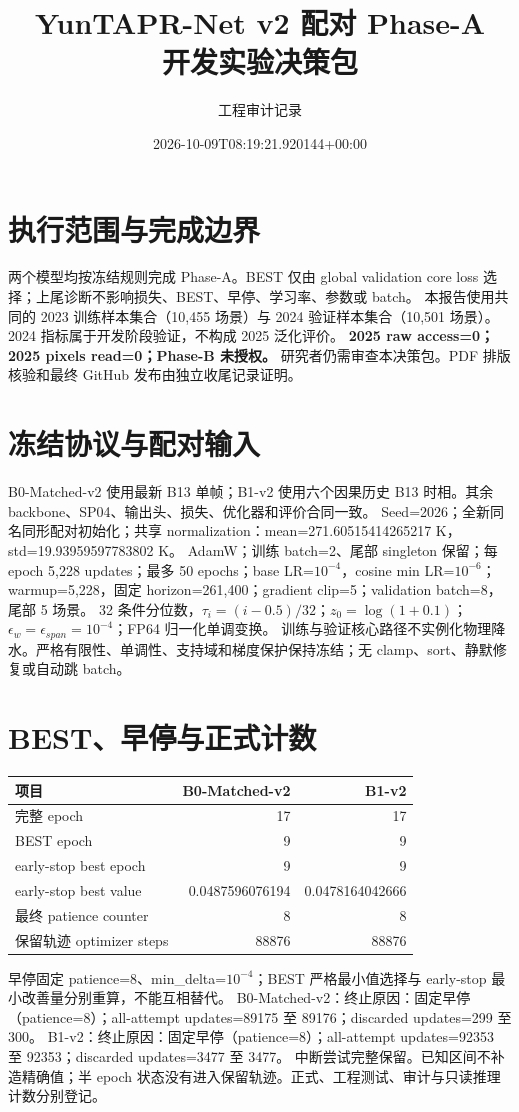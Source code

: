 \documentclass[UTF8,a4paper,11pt,fontset=windows]{ctexart}
\title{YunTAPR-Net v2 配对 Phase-A\\开发实验决策包}
\author{工程审计记录}\date{2026-10-09T08:19:21.920144+00:00}
\begin{document}
\maketitle
\section{执行范围与完成边界}
两个模型均按冻结规则完成 Phase-A。BEST 仅由 global validation core loss 选择；上尾诊断不影响损失、BEST、早停、学习率、参数或 batch。
本报告使用共同的 2023 训练样本集合（10,455 场景）与 2024 验证样本集合（10,501 场景）。2024 指标属于开发阶段验证，不构成 2025 泛化评价。
\textbf{2025 raw access=0；2025 pixels read=0；Phase-B 未授权。}
研究者仍需审查本决策包。PDF 排版核验和最终 GitHub 发布由独立收尾记录证明。
\section{冻结协议与配对输入}
B0-Matched-v2 使用最新 B13 单帧；B1-v2 使用六个因果历史 B13 时相。其余 backbone、SP04、输出头、损失、优化器和评价合同一致。
Seed=2026；全新同名同形配对初始化；共享 normalization：mean=271.60515414265217 K，std=19.93959597783802 K。
AdamW；训练 batch=2、尾部 singleton 保留；每 epoch 5,228 updates；最多 50 epochs；base LR=$10^{-4}$，cosine min LR=$10^{-6}$；warmup=5,228，固定 horizon=261,400；gradient clip=5；validation batch=8，尾部 5 场景。
32 条件分位数，$\tau_i=(i-0.5)/32$；$z_0=\log(1+0.1)$；$\epsilon_w=\epsilon_{span}=10^{-4}$；FP64 归一化单调变换。
训练与验证核心路径不实例化物理降水。严格有限性、单调性、支持域和梯度保护保持冻结；无 clamp、sort、静默修复或自动跳 batch。
\section{BEST、早停与正式计数}
\par\noindent\begin{tabular}{lrr}\toprule 项目 & B0-Matched-v2 & B1-v2\\\midrule
完整 epoch & 17 & 17\\
BEST epoch & 9 & 9\\
early-stop best epoch & 9 & 9\\
early-stop best value & 0.0487596076194 & 0.0478164042666\\
最终 patience counter & 8 & 8\\
保留轨迹 optimizer steps & 88876 & 88876\\
\bottomrule\end{tabular}\par
早停固定 patience=8、min\_delta=$10^{-4}$；BEST 严格最小值选择与 early-stop 最小改善量分别重算，不能互相替代。
B0-Matched-v2：终止原因：固定早停（patience=8）；all-attempt updates=89175 至 89176；discarded updates=299 至 300。
B1-v2：终止原因：固定早停（patience=8）；all-attempt updates=92353 至 92353；discarded updates=3477 至 3477。
中断尝试完整保留。已知区间不补造精确值；半 epoch 状态没有进入保留轨迹。正式、工程测试、审计与只读推理计数分别登记。
\end{document}

